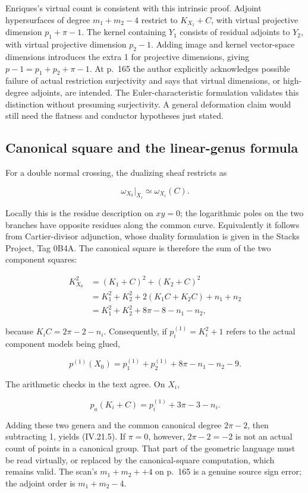 Enriques's virtual count is consistent with this intrinsic proof. Adjoint hypersurfaces of degree \(m_1+m_2-4\) restrict to \(K_{X_1}+C\), with virtual projective dimension \(p_1+\pi-1\). The kernel containing \(Y_1\) consists of residual adjoints to \(Y_2\), with virtual projective dimension \(p_2-1\). Adding image and kernel vector-space dimensions introduces the extra 1 for projective dimensions, giving \(p-1=p_1+p_2+\pi-1\). At p.~165 the author explicitly acknowledges possible failure of actual restriction surjectivity and says that virtual dimensions, or high-degree adjoints, are intended. The Euler-characteristic formulation validates this distinction without presuming surjectivity. A general deformation claim would still need the flatness and conductor hypotheses just stated.

\subsection{Canonical square and the linear-genus formula}

For a double normal crossing, the dualizing sheaf restricts as

\[
\omega_{X_0}|_{X_i}\simeq\omega_{X_i}(C).
\tag{IV.21.3}
\]

Locally this is the residue description on \(xy=0\); the logarithmic poles on the two branches have opposite residues along the common curve. Equivalently it follows from Cartier-divisor adjunction, whose duality formulation is given in the Stacks Project, Tag 0B4A. The canonical square is therefore the sum of the two component squares:

\[
\begin{aligned}
K_{X_0}^2
&=(K_1+C)^2+(K_2+C)^2\\
&=K_1^2+K_2^2+2(K_1C+K_2C)+n_1+n_2\\
&=K_1^2+K_2^2+8\pi-8-n_1-n_2,
\end{aligned}
\tag{IV.21.4}
\]

because \(K_i C=2\pi-2-n_i\). Consequently, if \(p_i^{(1)}=K_i^2+1\) refers to the actual component models being glued,

\[
\boxed{p^{(1)}(X_0)=p_1^{(1)}+p_2^{(1)}+
8\pi-n_1-n_2-9.}
\tag{IV.21.5}
\]

The arithmetic checks in the text agree. On \(X_i\),

\[
p_a(K_i+C)=p_i^{(1)}+3\pi-3-n_i.
\]

Adding these two genera and the common canonical degree \(2\pi-2\), then subtracting 1, yields (IV.21.5). If \(\pi=0\), however, \(2\pi-2=-2\) is not an actual count of points in a canonical group. That part of the geometric language must be read virtually, or replaced by the canonical-square computation, which remains valid. The scan's \(m_1+m_2+ +4\) on p.~165 is a genuine source sign error; the adjoint order is \(m_1+m_2-4\).

